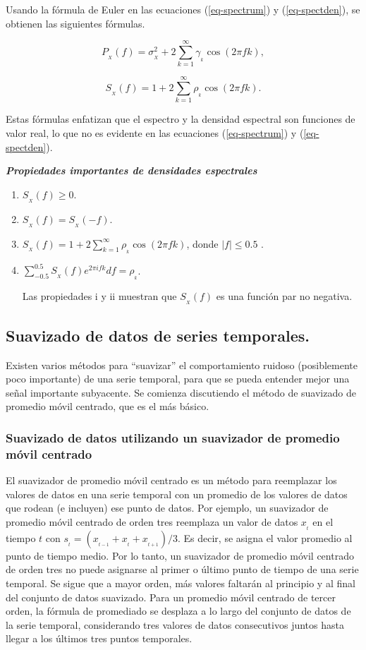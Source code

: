 \documentclass[
  us-letterpaper,
]{scrreprt}
\theoremstyle{plain}
\theoremstyle{definition}
\theoremstyle{definition}
\theoremstyle{plain}
\theoremstyle{remark}
\begin{document}
Usando la fórmula de Euler en las ecuaciones (\ref{eq-spectrum}) y
(\ref{eq-spectden}), se obtienen las siguientes fórmulas.

\[
P_{_X}(f)=\sigma_{_X}^2+2\sum_{k=1}^\infty\gamma_{_k}\cos(2\pi fk),
\]

\[
S_{_X}(f)=1+2\sum_{k=1}^\infty \rho_{_k}\cos(2\pi fk).
\]

Estas fórmulas enfatizan que el espectro y la densidad espectral son
funciones de valor real, lo que no es evidente en las ecuaciones
(\ref{eq-spectrum}) y (\ref{eq-spectden}).

\textbf{\emph{Propiedades importantes de densidades espectrales}}

\begin{enumerate}
\def\labelenumi{\roman{enumi}.}
\item
  \(S_{_X}(f)\geq 0\).
\item
  \(S_{_X}(f)=S_{_X}(-f)\).
\item
  \(S_{_X}(f)=1+2\sum\limits_{k=1}^\infty \rho_{_k}\cos(2\pi fk)\),
  donde \(|f|\le 0.5\) .
\item
  \(\sum\limits_{-0.5}^{0.5}S_{_X}(f)e^{2\pi ifk}df=\rho_{_k}\).

  Las propiedades i y ii muestran que \(S_{_X}(f)\) es una función par
  no negativa.
\end{enumerate}

\subsection{Suavizado de datos de series
temporales.}\label{suavizado-de-datos-de-series-temporales.}

Existen varios métodos para ``suavizar'' el comportamiento ruidoso
(posiblemente poco importante) de una serie temporal, para que se pueda
entender mejor una señal importante subyacente. Se comienza discutiendo
el método de suavizado de promedio móvil centrado, que es el más básico.

\subsubsection{Suavizado de datos utilizando un suavizador de promedio
móvil centrado}\label{sec-mas}

El suavizador de promedio móvil centrado es un método para reemplazar
los valores de datos en una serie temporal con un promedio de los
valores de datos que rodean (e incluyen) ese punto de datos. Por
ejemplo, un suavizador de promedio móvil centrado de orden tres
reemplaza un valor de datos \(x_{_t}\) en el tiempo \(t\) con
\(s_{_t} = (x_{_{t-1}}+x_{_t}+x_{_{t+1}})/3\). Es decir, se asigna el
valor promedio al punto de tiempo medio. Por lo tanto, un suavizador de
promedio móvil centrado de orden tres no puede asignarse al primer o
último punto de tiempo de una serie temporal. Se sigue que a mayor
orden, más valores faltarán al principio y al final del conjunto de
datos suavizado. Para un promedio móvil centrado de tercer orden, la
fórmula de promediado se desplaza a lo largo del conjunto de datos de la
serie temporal, considerando tres valores de datos consecutivos juntos
hasta llegar a los últimos tres puntos temporales.
\end{document}
